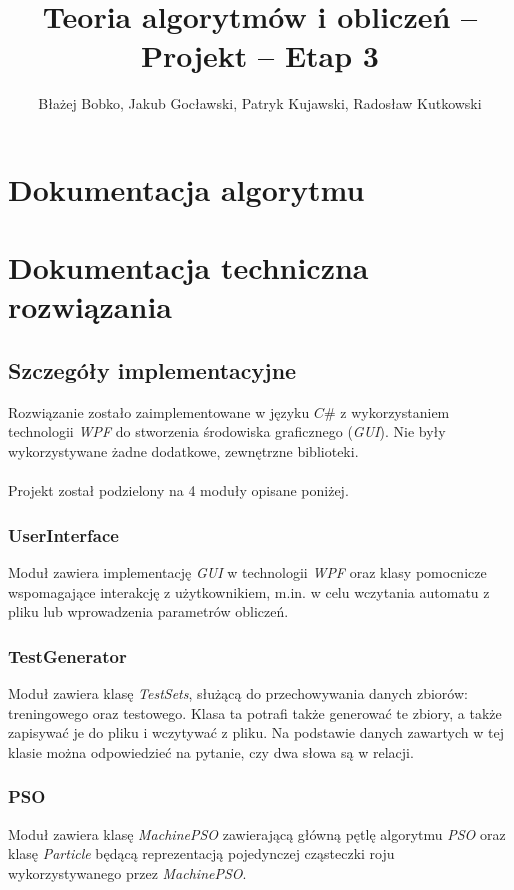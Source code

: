\documentclass{../llncs_template_final/llncs}
\begin{document}
\title{Teoria algorytmów i obliczeń -- Projekt -- Etap 3}
\author{Błażej Bobko, Jakub Gocławski, Patryk Kujawski, Radosław Kutkowski}
\maketitle 

\section{Dokumentacja algorytmu}

\section{Dokumentacja techniczna rozwiązania}


\subsection{Szczegóły implementacyjne}

Rozwiązanie zostało zaimplementowane w języku $C\#$ z wykorzystaniem technologii \emph{WPF} do stworzenia środowiska graficznego (\emph{GUI}). Nie były wykorzystywane żadne dodatkowe, zewnętrzne biblioteki.
\\
\\
Projekt został podzielony na 4 moduły opisane poniżej.

\subsubsection*{UserInterface}
Moduł zawiera implementację \emph{GUI} w technologii \emph{WPF} oraz klasy pomocnicze wspomagające interakcję z użytkownikiem, m.in. w celu wczytania automatu z pliku lub wprowadzenia parametrów obliczeń.

\subsubsection*{TestGenerator}
Moduł zawiera klasę \emph{TestSets}, służącą do przechowywania danych zbiorów: treningowego oraz testowego. Klasa ta potrafi także generować te zbiory, a także zapisywać je do pliku i wczytywać z pliku. Na podstawie danych zawartych w tej klasie można odpowiedzieć na pytanie, czy dwa słowa są w relacji.

\subsubsection*{PSO}
Moduł zawiera klasę \emph{MachinePSO} zawierającą główną pętlę algorytmu \emph{PSO} oraz klasę \emph{Particle} będącą reprezentacją pojedynczej cząsteczki roju wykorzystywanego przez \emph{MachinePSO}.
\end{document}

